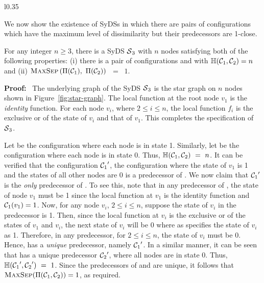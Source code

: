 \smallskip

\begin{wrapfigure}[9]{l}{0.35\textwidth}
\centering

\caption{\small{Star graph used in the proof of
Proposition~\ref{pro:far-close}.}}
\label{fig:star-graph}
\smallskip
\end{wrapfigure}
We now show the existence of SyDSs in which there 
are pairs of configurations which have the maximum level 
of dissimilarity but their predecessors are 1-close. 

\begin{proposition}\label{pro:far-close}
For any integer $n \geq 3$,
there is a SyDS $\mbox{$\mathcal{S}$}_3${} with $n$
nodes satisfying both of the following properties: 
(i) there is a pair of configurations
\calcone{} and \calctwo{} with $\mbox{$\mathbb{H}$}(\mbox{$\mathcal{C}_{1}$}, \mbox{$\mathcal{C}_{2}$}) = n$  and 
(ii) $\mbox{\textsc{MaxSep}}\left( \mbox{$\Pi(\mbox{$\mathcal{C}_{1}$})$},~ \mbox{$\Pi(\mbox{$\mathcal{C}_{2}$})$} \right)$ ~=~ $1$.
\end{proposition}

\noindent
\textbf{Proof:}~ The underlying graph of the SyDS $\mbox{$\mathcal{S}$}_3$ is
the star graph on $n$ nodes shown in Figure~\ref{fig:star-graph}.
The local function at the root node $v_1$ is the \emph{identity}
function.
For each node $v_i$, where $2 \leq i \leq n$, the local function
$f_i$ is the exclusive or of the state of $v_i$ and that of $v_1$.  
This completes the specification of $\mbox{$\mathcal{S}$}_3$.

Let \calcone{} be the configuration where each node is in state 1.
Similarly, let \calctwo{} be the configuration where each node is in state 0.
Thus, $\mbox{$\mathbb{H}$}(\mbox{$\mathcal{C}_{1}$}, \mbox{$\mathcal{C}_{2}$}) ~=~ n$.
It can be verified that the configuration
$\mbox{$\mathcal{C}_{1}$}'$, 
the configuration where the state of $v_1$ is 1 and the states of all other
nodes are 0 is a predecessor of \calcone.
We now claim that $\mbox{$\mathcal{C}_{1}$}'$ is the \emph{only} predecessor of \calcone.
To see this, note that  in any predecessor of \calcone, 
the state of node $v_1$ must be 1
since the local function at $v_1$ is the 
identity function and $\mbox{$\mathcal{C}_{1}$}(v_1) = 1$.
Now, for any node $v_i$, $2 \leq i \leq n$, 
suppose the state of $v_i$ in the predecessor is 1. 
Then, since the local function at $v_i$ is the exclusive or of the states of $v_1$
and $v_i$, the next state of $v_i$ will be 0 where as \calcone{} specifies
the state of $v_i$ as 1. 
Therefore, in any predecessor, for $2 \leq i \leq n$, the state of $v_i$ must be 0.
Hence, \calcone{} has a \emph{unique} predecessor, namely $\mbox{$\mathcal{C}_{1}$}'$.
In a similar manner, it can be seen that \calctwo{} has a unique predecessor 
$\mbox{$\mathcal{C}_{2}$}'$, where all nodes are in state 0.
Thus, $\mbox{$\mathbb{H}$}(\mbox{$\mathcal{C}_{1}$}', \mbox{$\mathcal{C}_{2}$}') ~=~ 1$.
Since the predecessors of \calcone{} and \calctwo{} are unique,
it follows that $\mbox{\textsc{MaxSep}}(\Pi(\mbox{$\mathcal{C}_{1}$}, \mbox{$\mathcal{C}_{2}$})) = 1$, as required. \QED

